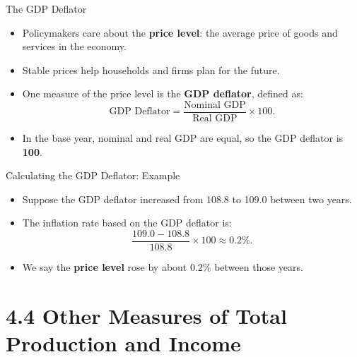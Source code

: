 \documentclass[aspectratio=169]{beamer}
\begin{document}

\begin{frame}{The GDP Deflator}
\transfade
\begin{itemize}
  \item Policymakers care about the \textbf{price level}: the average price of goods and services in the economy.
  \item Stable prices help households and firms plan for the future.
  \item One measure of the price level is the \textbf{GDP deflator}, defined as:
  \[
    \text{GDP Deflator} = \frac{\text{Nominal GDP}}{\text{Real GDP}} \times 100.
  \]
  \item In the base year, nominal and real GDP are equal, so the GDP deflator is \textbf{100}.
\end{itemize}
\end{frame}

\begin{frame}{Calculating the GDP Deflator: Example}
\transfade
\begin{itemize}
  \item Suppose the GDP deflator increased from 108.8 to 109.0 between two years.
  \item The inflation rate based on the GDP deflator is:
  \[
    \frac{109.0 - 108.8}{108.8} \times 100 \approx 0.2\%.
  \]
  \item We say the \textbf{price level} rose by about 0.2\% between those years.
\end{itemize}
\end{frame}



\section{4.4 Other Measures of Total Production and Income}
\end{document}
